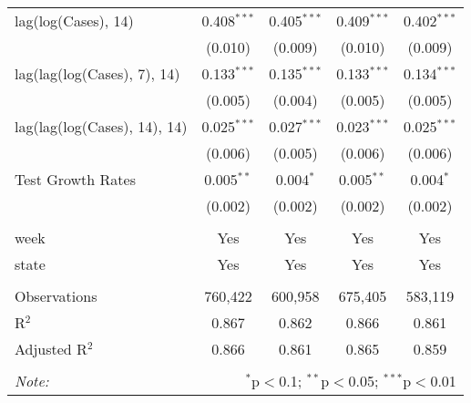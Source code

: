 \begin{tabular}{@{\extracolsep{1pt}}lcccc}
  lag(log(Cases), 14) & 0.408$^{***}$ & 0.405$^{***}$ & 0.409$^{***}$ & 0.402$^{***}$ \\ 
  & (0.010) & (0.009) & (0.010) & (0.009) \\ 
  lag(lag(log(Cases), 7), 14) & 0.133$^{***}$ & 0.135$^{***}$ & 0.133$^{***}$ & 0.134$^{***}$ \\ 
  & (0.005) & (0.004) & (0.005) & (0.005) \\ 
  lag(lag(log(Cases), 14), 14) & 0.025$^{***}$ & 0.027$^{***}$ & 0.023$^{***}$ & 0.025$^{***}$ \\ 
  & (0.006) & (0.005) & (0.006) & (0.006) \\ 
  Test Growth Rates & 0.005$^{**}$ & 0.004$^{*}$ & 0.005$^{**}$ & 0.004$^{*}$ \\ 
  & (0.002) & (0.002) & (0.002) & (0.002) \\ 
 \hline \\[-1.8ex] 
week & Yes & Yes & Yes & Yes \\ 
state & Yes & Yes & Yes & Yes \\ 
\hline \\[-1.8ex] 
Observations & 760,422 & 600,958 & 675,405 & 583,119 \\ 
R$^{2}$ & 0.867 & 0.862 & 0.866 & 0.861 \\ 
Adjusted R$^{2}$ & 0.866 & 0.861 & 0.865 & 0.859 \\ 
\hline 
\hline \\[-1.8ex] 
\textit{Note:}  & \multicolumn{4}{r}{$^{*}$p$<$0.1; $^{**}$p$<$0.05; $^{***}$p$<$0.01} \\ 
\end{tabular} 